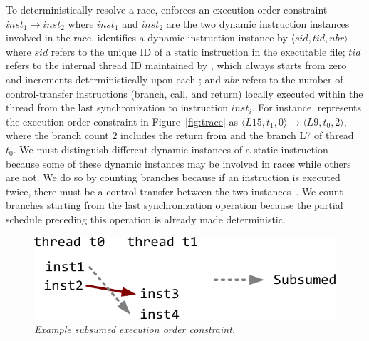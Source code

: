To deterministically resolve a race, \peregrine enforces an execution order
constraint $inst_1 \rightarrow inst_2$ where $inst_1$ and $inst_2$ are the
two dynamic instruction instances involved in the race.  \peregrine identifies a
dynamic instruction instance by $\langle sid, tid, nbr \rangle$ where
$sid$ refers to the unique ID of a static instruction in the executable
file; $tid$ refers to the internal thread ID maintained by \peregrine, which
always starts from zero and increments deterministically upon each
; and $nbr$ refers to the number of control-transfer
instructions (branch, call, and return) locally executed within the thread
from the last synchronization to instruction $inst_i$.  For instance, \peregrine
represents the execution order constraint in
Figure~\ref{fig:trace} as $\langle L15,t_1,0\rangle \rightarrow
\langle L9,t_0,2 \rangle$, where the branch count $2$ includes the return
from  and the branch L7 of thread $t_0$.
We must distinguish different dynamic instances of a static instruction
because some of these dynamic instances may be involved in races while others
are not.  We do so by counting branches because if an instruction is
executed twice, there must be a control-transfer between
the two instances~\cite{smp-revirt:vee08}.  We count branches starting from the last
synchronization operation because the partial schedule preceding this
operation is already made deterministic.



\begin{figure}[t]
\centering
\includegraphics[width=.65\columnwidth]{peregrine/figures/pruned-order}
\caption{{\em Example subsumed execution order
    constraint.}} \label{fig:subsumed}
\end{figure}

